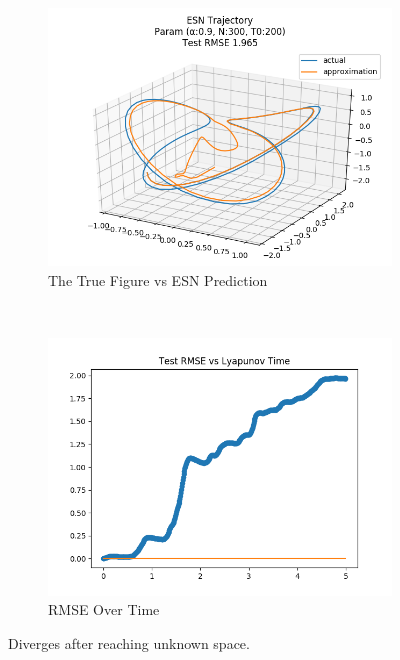 \documentclass{article}
\begin{document}
\begin{figure}[H]
    \centering
    \begin{subfigure}[b]{0.45\textwidth}
        \includegraphics[width=\textwidth]{doc/paper/images/lorenz/rank_5_param_387_fit.png}
        \caption{The True Figure vs ESN Prediction}
        \label{fig:lorenz_r5_fit}
    \end{subfigure}
    ~
    \begin{subfigure}[b]{0.45\textwidth}
        \includegraphics[width=\textwidth]{doc/paper/images/lorenz/rank_5_param_387_rmse.png}
        \caption{RMSE Over Time}
        \label{fig:lorenz_r5_rmse}
    \end{subfigure}
    \caption{Diverges after reaching unknown space.}
    \label{fig:lorenz_r5}
\end{figure}
\end{document}

